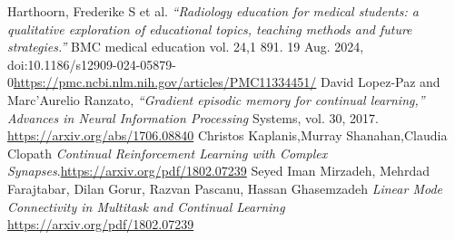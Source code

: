 \documentclass{IEEEcsmag}
\begin{document}
\begin{thebibliography}{31}
    Harthoorn, Frederike S et al. \textit{“Radiology education for medical students: a qualitative exploration of educational topics, teaching methods and future strategies.”} BMC medical education vol. 24,1 891. 19 Aug. 2024, doi:10.1186/s12909-024-05879-0\url{https://pmc.ncbi.nlm.nih.gov/articles/PMC11334451/}
    David Lopez-Paz and Marc’Aurelio Ranzato, \textit{“Gradient episodic memory for continual learning,” Advances in Neural Information Processing}
    Systems, vol. 30, 2017. \url{https://arxiv.org/abs/1706.08840}
    Christos Kaplanis,Murray Shanahan,Claudia Clopath \textit{Continual Reinforcement Learning with Complex Synapses}.\url{https://arxiv.org/pdf/1802.07239}
    Seyed Iman Mirzadeh, Mehrdad Farajtabar, Dilan Gorur, Razvan Pascanu, Hassan Ghasemzadeh \textit{Linear Mode Connectivity in Multitask and Continual Learning} \url{https://arxiv.org/pdf/1802.07239}
\end{thebibliography}\vspace*{-8pt}
\end{document}
